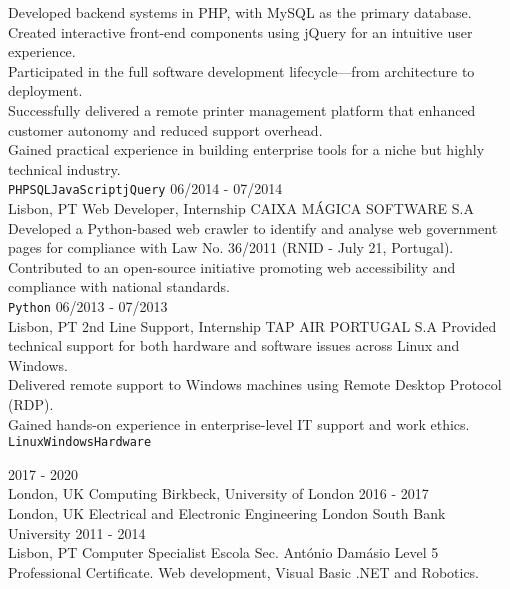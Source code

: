 \documentclass[9pt]{lib/developercv} %
\begin{document}
\begin{entrylist}
{			Developed backend systems in PHP, with MySQL as the primary database.\\
			Created interactive front-end components using jQuery for an intuitive user experience.\\
			Participated in the full software development lifecycle—from architecture to deployment.\\
			Successfully delivered a remote printer management platform that enhanced customer autonomy and reduced support overhead.\\
			Gained practical experience in building enterprise tools for a niche but highly technical industry.\\
			\texttt{PHP}\slashsep\texttt{SQL}\slashsep\texttt{JavaScript}\slashsep\texttt{jQuery}
		}
	\entry
		{06/2014 - 07/2014\\\footnotesize{Lisbon, PT}}
		{Web Developer, Internship}
		{CAIXA MÁGICA SOFTWARE S.A}
		{
			Developed a Python-based web crawler to identify and analyse web government pages for compliance with Law No. 36/2011 (RNID - July 21, Portugal).\\
			Contributed to an open-source initiative promoting web accessibility and compliance with national standards.\\
			\texttt{Python}
		}
	\entry
		{06/2013 - 07/2013\\\footnotesize{Lisbon, PT}}
		{2nd Line Support, Internship}
		{TAP AIR PORTUGAL S.A}
		{
			Provided technical support for both hardware and software issues across Linux and Windows.\\
			Delivered remote support to Windows machines using Remote Desktop Protocol (RDP).\\
			Gained hands-on experience in enterprise-level IT support and work ethics.\\
			\texttt{Linux}\slashsep\texttt{Windows}\slashsep\texttt{Hardware}
		}
\end{entrylist}



\begin{entrylist}
	\entry
		{2017 - 2020\\\footnotesize{London, UK}}
		{Computing}
		{Birkbeck, University of London}
		{}
	\entry
		{2016 - 2017\\\footnotesize{London, UK}}
		{Electrical and Electronic Engineering}
		{London South Bank University}
		{}
	\entry
		{2011 - 2014\\\footnotesize{Lisbon, PT}}
		{Computer Specialist}
		{Escola Sec. António Damásio}
		{Level 5 Professional Certificate. Web development, Visual Basic .NET and Robotics.}
\end{entrylist}
\end{document}

